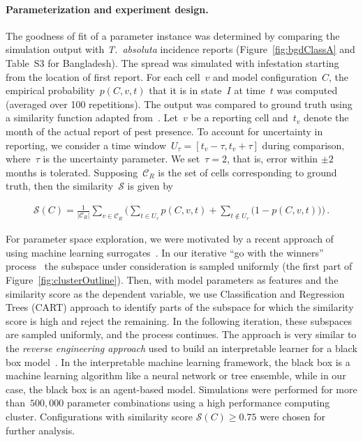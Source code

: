 \documentclass[11pt]{article}
\newcommand{\tuta}{\emph{T.~absoluta}}
\newcommand{\reportingCells}{\mathcal{C}_R}
\newcommand{\similarity}{\mathcal{S}}
\theoremstyle{definition}
\begin{document}
\paragraph{Parameterization and experiment design.}
The goodness of fit of a parameter instance was determined by comparing the
simulation output with \tuta{} incidence reports
(Figure~\ref{fig:bgdClassA} and Table~S3 for Bangladesh).
The spread was simulated with infestation starting from the location of
first report. For each cell~$v$ and model configuration~$C$, the empirical
probability~$p(C,v,t)$ that it is in state~$I$ at time~$t$ was computed
(averaged over 100 repetitions). The output was compared to ground truth
using a similarity
function adapted from~\cite{carrasco2010unveiling}.  Let~$v$ be a reporting
cell and~$t_v$ denote the month of the actual report of pest presence.  To
account for uncertainty in reporting, we consider a time
window~$U_\tau=[t_v-\tau,t_v+\tau]$ during comparison, where~$\tau$ is the
uncertainty parameter. We set~$\tau=2$, that is, error within $\pm2$ months is
tolerated.  Supposing~$\reportingCells$ is the set of cells corresponding
to ground truth, then the
similarity~$\similarity$ is given by
\begin{linenomath}
\begin{align}\label{eqn:similarity}
    \similarity(C)=\frac{1}{|\reportingCells|}\sum_{v\in\reportingCells} \Big(\sum_{t\in U_\tau}p(C,v,t)
    + \sum_{t\notin U_\tau}\big(1-p(C,v,t)\big) \Big)\,.
\end{align}
\end{linenomath}
For parameter space exploration, we were motivated by a recent approach of
using machine learning surrogates~\cite{lamperti2018agent}. In our
iterative ``go with the winners'' process~\cite{aldous1994go} the subspace
under consideration is sampled uniformly (the first part of
Figure~\ref{fig:clusterOutline}). Then, with model parameters as features
and the similarity score as the dependent variable, we use Classification
and Regression Trees (CART) approach to identify parts of the subspace for
which the similarity score is high and reject the remaining. In the
following iteration, these subspaces are sampled uniformly, and the process
continues. The approach is very similar to the \emph{reverse engineering
approach} used to build an interpretable learner for a black box
model~\cite[Fig. 10]{guidotti2019survey}. In the interpretable machine
learning framework, the black box is a machine learning algorithm like a
neural network or tree ensemble, while in our case, the black box is an
agent-based model. Simulations were performed for more than~$500,000$
parameter combinations using a high performance computing cluster.
Configurations with similarity score $\similarity(C)\ge0.75$ were chosen
for further analysis.
\end{document}

